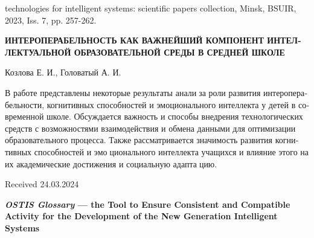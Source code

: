 \documentclass[10pt, a4paper]{article}
\begin{document}
\begin{multicols}{2}
\begin{footnotesize}
\begin{thebibliography}{20}
technologies for intelligent systems: scientific papers collection,
Minsk, BSUIR, 2023, Iss. 7, pp. 257-262.
\end{thebibliography}
\end{footnotesize}
\begin{otherlanguage}{russian}
\begin{center}
\vspace{0.3cm}
\small{\textbf{ИНТЕРОПЕРАБЕЛЬНОСТЬ КАК
ВАЖНЕЙШИЙ КОМПОНЕНТ
ИНТЕЛЛЕКТУАЛЬНОЙ ОБРАЗОВАТЕЛЬНОЙ
СРЕДЫ В СРЕДНЕЙ ШКОЛЕ}}
\vspace{0.1cm} \par
\large{Козлова Е. И., Головатый А. И.}
\end{center}

В работе представлены некоторые результаты анализа роли развития интероперабельности, когнитивных
способностей и эмоционального интеллекта у детей в
современной школе. Обсуждается важность и способы
внедрения технологических средств с возможностями
взаимодействия и обмена данными для оптимизации
образовательного процесса. Также рассматривается
значимость развития когнитивных способностей и эмоционального интеллекта учащихся и влияние этого на
их академические достижения и социальную адаптацию.
\end{otherlanguage}
\begin{flushright}
Received 24.03.2024
\end{flushright}
\end{multicols}
\begin{center}
\Huge{\textbf{\textit{OSTIS Glossary} — the Tool to Ensure
Consistent and Compatible Activity for the
Development of the New Generation Intelligent
Systems}}
\end{center}
\vspace{0.4cm}
\begin{center}
\center{}
\end{center}
\end{document}
